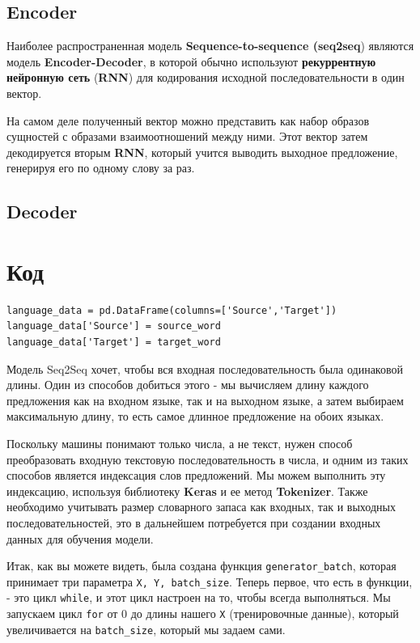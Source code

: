 \documentclass[a4paper,12pt]{article}
\begin{document}
	\subsection{Encoder}
	
	Наиболее распространенная модель \textbf{Sequence-to-sequence (seq2seq}) являются модель \textbf{Encoder-Decoder}, в которой обычно используют \textbf{рекуррентную нейронную сеть} (\textbf{RNN}) для кодирования исходной последовательности в один вектор.
	
	На самом деле полученный вектор можно представить как набор образов сущностей с образами взаимоотношений между ними. Этот вектор затем декодируется вторым \textbf{RNN}, который учится выводить выходное предложение, генерируя его по одному слову за раз.
	
	\clearpage
	
	\subsection{Decoder}
	
	\clearpage
	
	\section{Код}
	
	\begin{verbatim}
language_data = pd.DataFrame(columns=['Source','Target'])
language_data['Source'] = source_word
language_data['Target'] = target_word
	\end{verbatim}
	
	Модель Seq2Seq хочет, чтобы вся входная последовательность была одинаковой длины. Один из способов добиться этого - мы вычисляем длину каждого предложения как на входном языке, так и на выходном языке, а затем выбираем максимальную длину, то есть самое длинное предложение на обоих языках. 
	
	Поскольку машины понимают только числа, а не текст, нужен способ преобразовать входную текстовую последовательность в числа, и одним из таких способов является индексация слов предложений. Мы можем выполнить эту индексацию, используя библиотеку \textbf{Keras} и ее метод \textbf{Tokenizer}. Также необходимо учитывать размер словарного запаса как входных, так и выходных последовательностей, это в дальнейшем потребуется при создании входных данных для обучения модели.

    Итак, как вы можете видеть, была создана функция \texttt{generator_batch}, которая принимает три параметра \texttt{X, Y, batch_size}. Теперь первое, что есть в функции, - это цикл \texttt{while}, и этот цикл настроен на то, чтобы всегда выполняться. Мы запускаем цикл \texttt{for} от 0 до длины нашего \texttt{X} (тренировочные данные), который увеличивается на \texttt{batch_size}, который мы задаем сами. 
    
\end{document}
